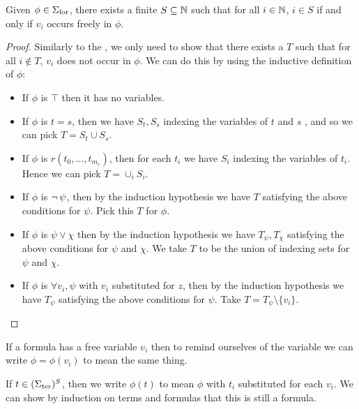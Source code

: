 \begin{prop}
    Given $\phi \in {\Sigma}_\mathrm{for}$,
    there exists a finite $S \subseteq \mathbb{N}$ such that
    for all $i \in \mathbb{N}$, $i \in S$ if and only if $v_i$ occurs freely in $\phi$.
    
\end{prop}
\begin{proof}
    Similarly to the , 
    we only need to show that there exists a $T$
    such that for all $i \notin T$,
    $v_i$ does not occur in $\phi$.
    We can do this by using the inductive definition of $\phi$:
    \begin{itemize}
        \item If $\phi$ is $\top$ then it has no variables.
        \item If $\phi$ is $t = s$, 
        then we have $S_t, S_s$ indexing the variables of $t$ and $s$ 
        ,
        and so we can pick $T = S_t \cup S_s$.
        \item If $\phi$ is $r(t_0, \dots, t_{m_r})$, 
        then for each $t_i$ we have $S_i$ indexing the variables of $t_i$.
        Hence we can pick $T = \cup_i S_i$.
        \item If $\phi$ is $\neg\, \psi$, 
        then by the induction hypothesis we have $T$ 
        satisfying the above conditions for $\psi$. 
        Pick this $T$ for $\phi$.
        \item If $\phi$ is $\psi \lor \chi$
        then by the induction hypothesis we have 
        $T_{\psi}, T_{\chi}$ satisfying the above conditions for $\psi$ and $\chi$.
        We take $T$ to be the union of indexing sets for $\psi$ and $\chi$.
        \item If $\phi$ is $\forall v_i, \psi$ with $v_i$ substituted for $z$,
        then by the induction hypothesis we have 
        $T_{\psi}$ satisfying the above conditions for $\psi$.
        Take $T = T_{\psi} \setminus \{v_i\}$.
    \end{itemize}
\end{proof}

\begin{nttn}
    If a formula has a free variable $v_i$ 
    then to remind ourselves of the variable we can write 
    $\phi = \phi(v_i)$ to mean the same thing.

    If $t \in ({\Sigma}_\mathrm{ter})^S$, 
    then we write $\phi(t)$ to mean $\phi$ with 
    $t_i$ substituted for each $v_i$.
    We can show by induction on terms and formulas that this is still a formula.
\end{nttn}


